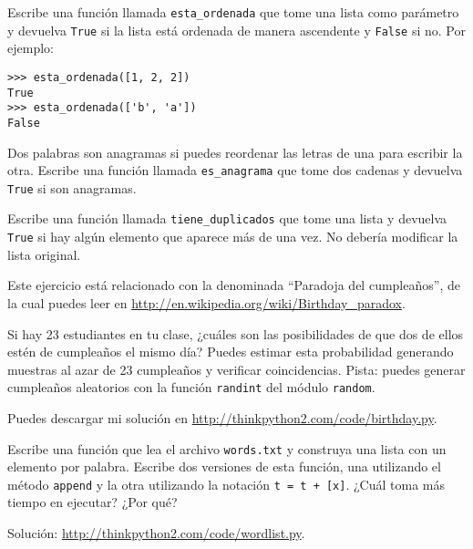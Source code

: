 \documentclass[10pt]{book}
\begin{document}
\begin{exercise}
Escribe una función llamada \verb"esta_ordenada" que tome una lista como
parámetro y devuelva {\tt True} si la lista está ordenada de manera
ascendente y {\tt False} si no.  Por ejemplo:

\begin{verbatim}
>>> esta_ordenada([1, 2, 2])
True
>>> esta_ordenada(['b', 'a'])
False
\end{verbatim}

\end{exercise}


\begin{exercise}
\label{anagram}

Dos palabras son anagramas si puedes reordenar las letras de una
para escribir la otra.  Escribe una función llamada \verb"es_anagrama"
que tome dos cadenas y devuelva {\tt True} si son anagramas.
\end{exercise}



\begin{exercise}
\label{duplicate}

Escribe una función llamada \verb"tiene_duplicados" que tome
una lista y devuelva {\tt True} si hay algún elemento que
aparece más de una vez.  No debería modificar la lista
original.

\end{exercise}


\begin{exercise}

Este ejercicio está relacionado con la denominada ``Paradoja del cumpleaños'', de la cual
puedes leer en \url{http://en.wikipedia.org/wiki/Birthday_paradox}.

Si hay 23 estudiantes en tu clase, ¿cuáles son las posibilidades
de que dos de ellos estén de cumpleaños el mismo día?  Puedes estimar esta
probabilidad generando muestras al azar de 23 cumpleaños
y verificar coincidencias.  Pista: puedes generar cumpleaños aleatorios
con la función {\tt randint} del módulo {\tt random}.

Puedes descargar mi
solución en \url{http://thinkpython2.com/code/birthday.py}.

\end{exercise}



\begin{exercise}

Escribe una función que lea el archivo {\tt words.txt} y construya
una lista con un elemento por palabra.  Escribe dos versiones de
esta función, una utilizando el método {\tt append} y la
otra utilizando la notación {\tt t = t + [x]}.  ¿Cuál toma más
tiempo en ejecutar?  ¿Por qué?

Solución: \url{http://thinkpython2.com/code/wordlist.py}.

\end{exercise}
\end{document}
